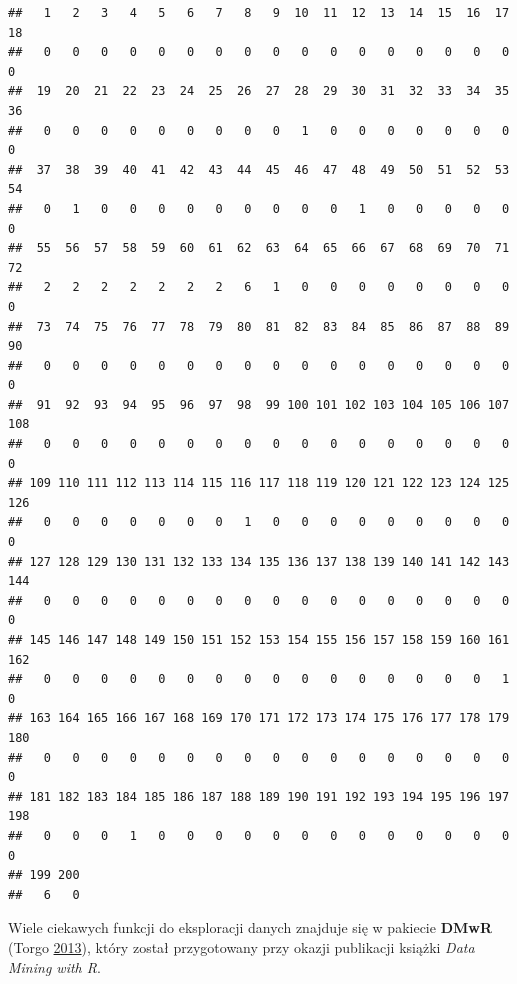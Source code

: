 \documentclass[]{book}
\newenvironment{Shaded}{\begin{snugshade}}{\end{snugshade}}
\newcommand{\CommentTok}[1]{\textcolor[rgb]{0.56,0.35,0.01}{\textit{#1}}}
\newcommand{\KeywordTok}[1]{\textcolor[rgb]{0.13,0.29,0.53}{\textbf{#1}}}
\newcommand{\NormalTok}[1]{#1}
\theoremstyle{plain}
\theoremstyle{definition}
\theoremstyle{definition}
\theoremstyle{definition}
\theoremstyle{definition}
\theoremstyle{remark}
\begin{document}
\begin{verbatim}
##   1   2   3   4   5   6   7   8   9  10  11  12  13  14  15  16  17  18 
##   0   0   0   0   0   0   0   0   0   0   0   0   0   0   0   0   0   0 
##  19  20  21  22  23  24  25  26  27  28  29  30  31  32  33  34  35  36 
##   0   0   0   0   0   0   0   0   0   1   0   0   0   0   0   0   0   0 
##  37  38  39  40  41  42  43  44  45  46  47  48  49  50  51  52  53  54 
##   0   1   0   0   0   0   0   0   0   0   0   1   0   0   0   0   0   0 
##  55  56  57  58  59  60  61  62  63  64  65  66  67  68  69  70  71  72 
##   2   2   2   2   2   2   2   6   1   0   0   0   0   0   0   0   0   0 
##  73  74  75  76  77  78  79  80  81  82  83  84  85  86  87  88  89  90 
##   0   0   0   0   0   0   0   0   0   0   0   0   0   0   0   0   0   0 
##  91  92  93  94  95  96  97  98  99 100 101 102 103 104 105 106 107 108 
##   0   0   0   0   0   0   0   0   0   0   0   0   0   0   0   0   0   0 
## 109 110 111 112 113 114 115 116 117 118 119 120 121 122 123 124 125 126 
##   0   0   0   0   0   0   0   1   0   0   0   0   0   0   0   0   0   0 
## 127 128 129 130 131 132 133 134 135 136 137 138 139 140 141 142 143 144 
##   0   0   0   0   0   0   0   0   0   0   0   0   0   0   0   0   0   0 
## 145 146 147 148 149 150 151 152 153 154 155 156 157 158 159 160 161 162 
##   0   0   0   0   0   0   0   0   0   0   0   0   0   0   0   0   1   0 
## 163 164 165 166 167 168 169 170 171 172 173 174 175 176 177 178 179 180 
##   0   0   0   0   0   0   0   0   0   0   0   0   0   0   0   0   0   0 
## 181 182 183 184 185 186 187 188 189 190 191 192 193 194 195 196 197 198 
##   0   0   0   1   0   0   0   0   0   0   0   0   0   0   0   0   0   0 
## 199 200 
##   6   0
\end{verbatim}

Wiele ciekawych funkcji do eksploracji danych znajduje się w pakiecie \textbf{DMwR} (Torgo \protect\hyperlink{ref-R-DMwR}{2013}), który został przygotowany przy okazji publikacji książki \emph{Data Mining with R}.

\begin{Shaded}
\end{Shaded}
\end{document}
